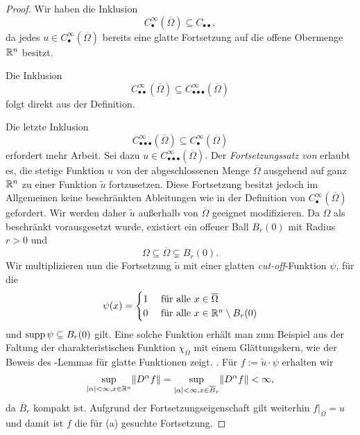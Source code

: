 \begin{proof}
  Wir haben die Inklusion
  $$
  C^\infty_\bullet(\overline\Omega) \subseteq C_{\bullet\bullet},
  $$ 
  da jedes $u\in C^\infty_\bullet(\overline\Omega)$ bereits eine glatte Fortsetzung auf die offene Obermenge $\mathbb{R}^n$ besitzt.

  Die Inklusion $$C^\infty_{\bullet\bullet}(\overline\Omega) \subseteq C^\infty_{\bullet\bullet\bullet}(\overline\Omega)$$ folgt direkt aus der Definition.
  
  Die letzte Inklusion $$C^\infty_{\bullet\bullet\bullet}(\overline\Omega) \subseteq C^\infty_{\bullet}(\overline\Omega)$$ erfordert mehr Arbeit.
  Sei dazu $u \in C^\infty_{\bullet\bullet\bullet}(\overline\Omega)$.
  Der \emph{Fortsetzungssatz von \stein} \cite[S.172, Proposition 2.2]{stein1970singular} erlaubt es, die stetige Funktion $u$ von der abgeschlossenen Menge $\overline\Omega$ ausgehend auf ganz $\mathbb{R}^n$ zu einer Funktion $\tilde u$ fortzusetzen.
  Diese Fortsetzung besitzt jedoch im Allgemeinen keine beschränkten Ableitungen wie in der Definition von $C^\infty_{\bullet}(\overline\Omega)$ gefordert.
  Wir werden daher $\tilde u$ außerhalb von $\overline\Omega$ geeignet modifizieren.
  Da $\Omega$ als beschränkt vorausgesetzt wurde, existiert ein offener Ball $B_r(0)$ mit Radius $r > 0$ und 
  $$
  \Omega \subseteq \overline\Omega \subsetneq B_r(0).
  $$ 
  Wir multiplizieren nun die Fortsetzung $\tilde u$ mit einer glatten \emph{cut-off}\hyp{}Funktion $\psi$, für die
  $$ 
  \psi(x) = \begin{cases}
                          1 &\text{ für alle } x \in \overline\Omega \\
                          0 &\text{ für alle } x \in \mathbb{R}^n \setminus B_r(0)
             \end{cases}
  $$
  und $\operatorname{supp} \psi \subseteq B_r(0)$ gilt.
  Eine solche Funktion erhält man zum Beispiel aus der Faltung der charakteristischen Funktion $\chi_{\overline\Omega}$ mit einem Glättungskern, wie der Beweis des \urysohn\hyp{}Lemmas für glatte Funktionen zeigt. \cite[S.88, Proposition 6.5]{folland2009ra}.
  Für $f := \tilde u \cdot \psi$ erhalten wir
  $$
  \sup_{|\alpha| < \infty, x \in \mathbb{R}^n}\lVert  D^\alpha f \rVert
   = \sup_{|\alpha| < \infty, x \in \overline B_r}\lVert  D^\alpha f \rVert
   < \infty,
  $$
  da $\overline B_r$ kompakt ist.
  Aufgrund der Fortsetzungseigenschaft gilt weiterhin $f|_{\overline\Omega} = u$ und damit ist $f$ die für (a) gesuchte Fortsetzung.
\end{proof}

